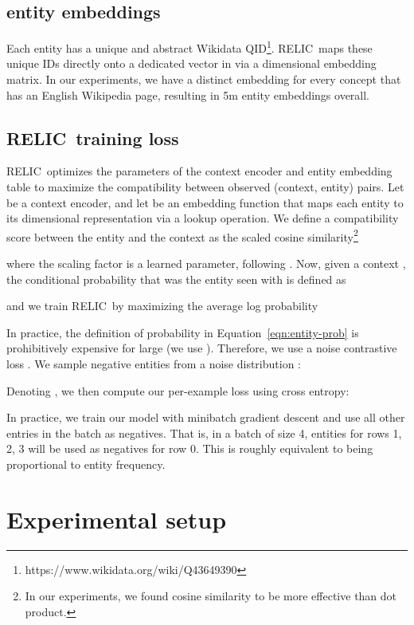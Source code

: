 \documentclass{article} \usepackage{iclr2020_conference,times}
\newcommand{\ack}{RELIC\xspace}
\begin{document}
\subsection{entity embeddings}
Each entity  has a unique and abstract Wikidata QID\footnote{https://www.wikidata.org/wiki/Q43649390}.
\ack~maps these unique IDs directly onto a dedicated vector in  via a  dimensional embedding matrix.
In our experiments, we have a distinct embedding for every concept that has an English Wikipedia page, resulting in 5m entity embeddings overall.

\subsection{\ack~training loss}
\label{sec:ent-ctx-compat}
\ack~optimizes the parameters of the context encoder and entity embedding table to maximize the compatibility between observed (context, entity) pairs. 
Let  be a context encoder, and let  be an embedding function that maps each entity to its  dimensional representation via a lookup operation.
We define a compatibility score between the entity  and the context  as the scaled cosine similarity\footnote{In our experiments, we found cosine similarity to be more effective than dot product.}

where the scaling factor  is a learned parameter, following \citet{wang2018additive}.
Now, given a context , the conditional probability that  was the entity seen with  is defined as

and we train \ack~by maximizing the average log probability 


In practice, the definition of probability in Equation~\ref{eqn:entity-prob} is prohibitively expensive for large  (we use ). 
Therefore, we use a noise contrastive loss \citep{gutmann2012noise, mnih2013learning}.
We sample  negative entities from a noise distribution :

Denoting , we then compute our per-example loss using cross entropy:




In practice, we train our model with minibatch gradient descent and use all other entries in the batch as negatives.
That is, in a batch of size 4, entities for rows 1, 2, 3 will be used as negatives for row 0. This is roughly equivalent to  being proportional to entity frequency.


 


\section{Experimental setup}
\label{sec:implementation}
\end{document}

